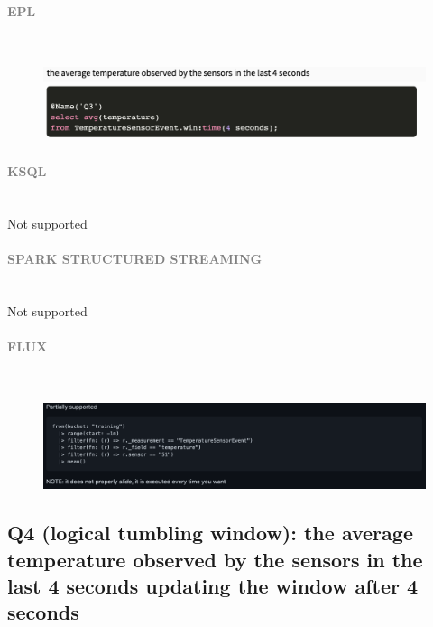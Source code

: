 \documentclass[10pt,a4paper]{article}
\newcommand{\myparagraph}[1]{\paragraph{\normalsize{\textcolor{gray}{\uppercase{\textbf{#1}}}} }\mbox{} \vspace{0.5em}\\}
\begin{document}
\myparagraph{EPL}
\begin{figure}[h!]
 \hfill \includegraphics[width=400pt]{images/epl_Q3}\hspace*{\fill}
\end{figure}
\myparagraph{KSQL}
Not supported
\myparagraph{Spark Structured Streaming}
Not supported
\myparagraph{Flux}
\begin{figure}[h!]
 \hfill \includegraphics[width=400pt]{images/flux_Q3}\hspace*{\fill}
\end{figure}

\pagebreak

\subsection{Q4 (logical tumbling window): the average temperature observed by the sensors in the last 4 seconds updating the window after 4 seconds}
\end{document}

